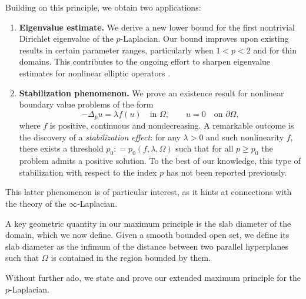 \documentclass[11pt]{amsart}
\theoremstyle{definition}
\begin{document}
\medskip
Building on this principle, we obtain two applications:
\begin{enumerate}
    \item \textbf{Eigenvalue estimate.} We derive a new lower bound for the first nontrivial Dirichlet eigenvalue of the $p$-Laplacian. Our bound improves upon existing results in certain parameter ranges, particularly when $1<p<2$ and for thin domains. This contributes to the ongoing effort to sharpen eigenvalue estimates for nonlinear elliptic operators \cite{Aghajani2017, BenediktDrabek2012,  KawohlFridman2003}.
    \item \textbf{Stabilization phenomenon.} We prove an existence result for nonlinear boundary value problems of the form
    \[
    -\Delta_p u = \lambda f(u) \quad \text{in } \Omega, \qquad u=0 \quad \text{on } \partial \Omega,
    \]
    where $f$ is positive, continuous and nondecreasing. A remarkable outcome is the discovery of a \emph{stabilization effect}: for any $\lambda>0$ and such nonlinearity $f$, there exists a threshold $p_0\colon =p_0\left(f,\lambda,\Omega\right)$ such that for all $p \geq p_0$ the problem admits a positive solution. To the best of our knowledge, this type of stabilization with respect to the index $p$ has not been reported previously.
\end{enumerate}

This latter phenomenon is of particular interest, as it hints at connections with the theory of the $\infty$-Laplacian.


\medskip
A key geometric quantity in our maximum principle is the slab diameter of the domain, which we now define.
Given a smooth bounded open set, we define its slab diameter as
the infimum of the distance between two parallel hyperplanes such that $\Omega$
is contained in the region bounded by them. 
 
\medskip
Without further ado, we state and prove our 
extended maximum principle for the $p$-Laplacian.
\end{document}
